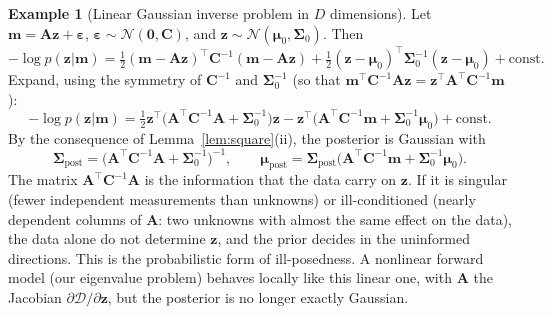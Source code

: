 \documentclass[11pt,a4paper]{article}
\numberwithin{equation}{section}
\theoremstyle{plain}
\theoremstyle{definition}
\newtheorem{example}[proposition]{Example}
\theoremstyle{remark}
\newcommand{\m}{\mathbf{m}}
\newcommand{\z}{\mathbf{z}}
\newcommand{\eps}{\bm{\varepsilon}}
\newcommand{\mub}{\bm{\mu}}
\newcommand{\Sig}{\bm{\Sigma}}
\newcommand{\Cb}{\mathbf{C}}
\newcommand{\Ab}{\mathbf{A}}
\newcommand{\N}{\mathcal{N}}
\newcommand{\Dc}{\mathcal{D}}
\begin{document}
\begin{example}[Linear Gaussian inverse problem in $D$ dimensions]
\label{ex:linear_gauss}
Let $\m=\Ab\z+\eps$, $\eps\sim\N(\mathbf0,\Cb)$, and $\z\sim\N(\mub_0,\Sig_0)$. Then
\begin{equation*}
-\log p(\z|\m)=\tfrac12(\m-\Ab\z)^\top\Cb^{-1}(\m-\Ab\z)+\tfrac12(\z-\mub_0)^\top\Sig_0^{-1}(\z-\mub_0)+\text{const}.
\end{equation*}
Expand, using the symmetry of $\Cb^{-1}$ and $\Sig_0^{-1}$ (so that $\m^\top\Cb^{-1}\Ab\z=\z^\top\Ab^\top\Cb^{-1}\m$):
\begin{equation*}
-\log p(\z|\m)=\tfrac12\z^\top\big(\Ab^\top\Cb^{-1}\Ab+\Sig_0^{-1}\big)\z-\z^\top\big(\Ab^\top\Cb^{-1}\m+\Sig_0^{-1}\mub_0\big)+\text{const}.
\end{equation*}
By the consequence of Lemma~\ref{lem:square}(ii), the posterior is Gaussian with
\begin{equation*}
\Sig_{\text{post}}=\big(\Ab^\top\Cb^{-1}\Ab+\Sig_0^{-1}\big)^{-1},\qquad \mub_{\text{post}}=\Sig_{\text{post}}\big(\Ab^\top\Cb^{-1}\m+\Sig_0^{-1}\mub_0\big).
\end{equation*}
The matrix $\Ab^\top\Cb^{-1}\Ab$ is the information that the data carry on $\z$. If it is singular (fewer independent measurements than unknowns) or ill-conditioned (nearly dependent columns of $\Ab$: two unknowns with almost the same effect on the data), the data alone do not determine $\z$, and the prior decides in the uninformed directions. This is the probabilistic form of ill-posedness. A nonlinear forward model (our eigenvalue problem) behaves locally like this linear one, with $\Ab$ the Jacobian $\partial\Dc/\partial\z$, but the posterior is no longer exactly Gaussian.
\end{example}
\end{document}
